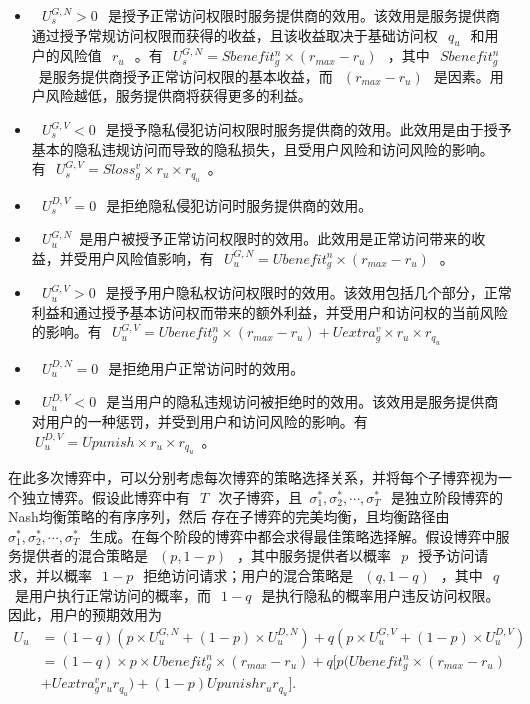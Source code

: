 \begin{itemize}
	\item ~$~U_s^{G,N} >0~$~是授予正常访问权限时服务提供商的效用。该效用是服务提供商通过授予常规访问权限而获得的收益，且该收益取决于基础访问权~$~q_u~$~和用户的风险值~$~r_u~$~。有~$~U_s^{G,N}= Sbenefit_g^n\times (r_{max}-r_u)~$~​​，其中~$~Sbenefit_g^n~$~是服务提供商授予正常访问权限的基本收益，而~$~(r_{max}-r_u)~$~​​是因素。用户风险越低，服务提供商将获得更多的利益。
	\item ~$~U_s^{G,V}<0~$~是授予隐私侵犯访问权限时服务提供商的效用。此效用是由于授予基本的隐私违规访问而导致的隐私损失，且受用户风险和访问风险的影响。有~$~U_s^{G,V}= Sloss_g^v \times r_u \times r_{q_u}$~。
	\item ~$~U_s^{D,V} = 0~$~是拒绝隐私侵犯访问时服务提供商的效用。
	\item ~$~U_u^{G,N}$~是用户被授予正常访问权限时的效用。此效用是正常访问带来的收益，并受用户风险值影响，有~$~U_u^{G,N}= Ubenefit_g^n \times(r_{max} - r_u)~$~。
	\item ~$~U_u^{G,V} >0~$~是授予用户隐私权访问权限时的效用。该效用包括几个部分，正常利益和通过授予基本访问权而带来的额外利益，并受用户和访问权的当前风险的影响。有~$~U_u^{G,V}= Ubenefit_g^n\times(r_{max} - r_u) + Uextra_g^v \times r_u\times r_{q_u}$~
	\item ~$~U_u^{D,N} =0~$~是拒绝用户正常访问时的效用。
	\item ~$~U_u^{D,V}<0~$~是当用户的隐私违规访问被拒绝时的效用。该效用是服务提供商对用户的一种惩罚，并受到用户和访问风险的影响。有~$~U_u^{D,V}= Upunish \times r_u \times r_{q_u}$~。
\end{itemize}

在此多次博弈中，可以分别考虑每次博弈的策略选择关系，并将每个子博弈视为一个独立博弈。假设此博弈中有~$~T~$~次子博弈，且~$\sigma_1^*, \sigma_2^*, \cdots, \sigma_T^*~$~是独立阶段博弈的Nash均衡策略的有序序列，然后 存在子博弈的完美均衡，且均衡路径由~$\sigma_1^*, \sigma_2^*, \cdots, \sigma_T^*~$~生成。在每个阶段的博弈中都会求得最佳策略选择解。假设博弈中服务提供者的混合策略是~$~(p,1-p)~$~，其中服务提供者以概率~$~p~$~授予访问请求，并以概率~$~1-p~$~拒绝访问请求；用户的混合策略是~$~(q,1-q)~$~，其中{~$~ q ~$~}是用户执行正常访问的概率，而~$~1-q~$~是执行隐私的概率用户违反访问权限。因此，用户的预期效用为
\begin{equation}
\begin{split}
U_u&= (1-q)(p\times U_u^{G,N}+ (1-p)\times U_u^{D,N})+ q(p\times U_u^{G,V}+(1-p)\times U_u^{D,V})\\
&=(1-q)\times p \times Ubenefit_g^n \times(r_{max} - r_u)+ q[p(Ubenefit_g^n\times(r_{max} - r_u) \\
&+ Uextra_g^v r_ur_{q_u})+(1-p)Upunishr_ur_{q_u}].
\end{split}
\end{equation}


